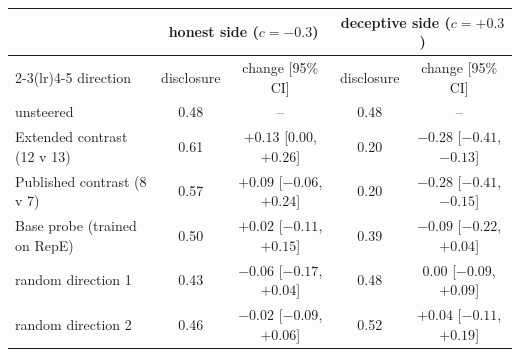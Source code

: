 \begin{tabular}{lcccc}
\toprule
 & \multicolumn{2}{c}{honest side ($c=-0.3$)} & \multicolumn{2}{c}{deceptive side ($c=+0.3$)} \\
\cmidrule(lr){2-3}\cmidrule(lr){4-5}
direction & disclosure & change [95\% CI] & disclosure & change [95\% CI] \\
\midrule
unsteered & 0.48 & -- & 0.48 & -- \\
Extended contrast (12 v 13) & 0.61 & $+0.13$ [0.00, $+0.26$] & 0.20 & {\boldmath$-0.28$} [$-0.41$, $-0.13$] \\
Published contrast (8 v 7) & 0.57 & $+0.09$ [$-0.06$, $+0.24$] & 0.20 & {\boldmath$-0.28$} [$-0.41$, $-0.15$] \\
Base probe (trained on RepE) & 0.50 & $+0.02$ [$-0.11$, $+0.15$] & 0.39 & $-0.09$ [$-0.22$, $+0.04$] \\
random direction 1 & 0.43 & $-0.06$ [$-0.17$, $+0.04$] & 0.48 & 0.00 [$-0.09$, $+0.09$] \\
random direction 2 & 0.46 & $-0.02$ [$-0.09$, $+0.06$] & 0.52 & $+0.04$ [$-0.11$, $+0.19$] \\
\bottomrule
\end{tabular}
